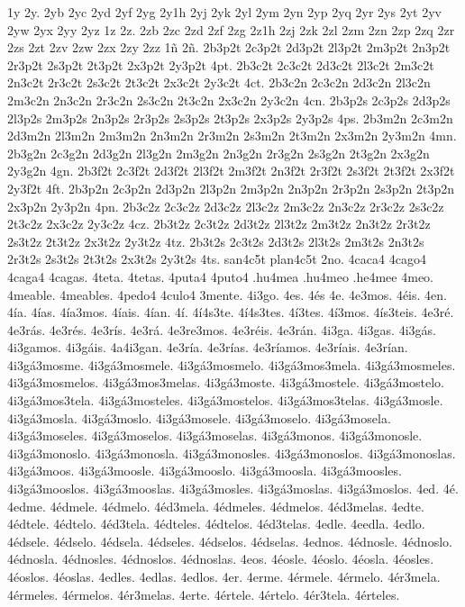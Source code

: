 {1y 2y. 2yb 2yc 2yd 2yf 2yg 2y1h 2yj 2yk 2yl 2ym 2yn 2yp 2yq 2yr 2ys 2yt 2yv 2yw 2yx 2yy 2yz
1z 2z. 2zb 2zc 2zd 2zf 2zg 2z1h 2zj 2zk 2zl 2zm 2zn 2zp 2zq 2zr 2zs 2zt 2zv 2zw 2zx 2zy 2zz
1ñ 2ñ.
2b3p2t 2c3p2t 2d3p2t 2l3p2t 2m3p2t 2n3p2t 2r3p2t 2s3p2t 2t3p2t 2x3p2t 2y3p2t 4pt.
2b3c2t 2c3c2t 2d3c2t 2l3c2t 2m3c2t 2n3c2t 2r3c2t 2s3c2t 2t3c2t 2x3c2t 2y3c2t 4ct.
2b3c2n 2c3c2n 2d3c2n 2l3c2n 2m3c2n 2n3c2n 2r3c2n 2s3c2n 2t3c2n 2x3c2n 2y3c2n 4cn.
2b3p2s 2c3p2s 2d3p2s 2l3p2s 2m3p2s 2n3p2s 2r3p2s 2s3p2s 2t3p2s 2x3p2s 2y3p2s 4ps.
2b3m2n 2c3m2n 2d3m2n 2l3m2n 2m3m2n 2n3m2n 2r3m2n 2s3m2n 2t3m2n 2x3m2n 2y3m2n 4mn.
2b3g2n 2c3g2n 2d3g2n 2l3g2n 2m3g2n 2n3g2n 2r3g2n 2s3g2n 2t3g2n 2x3g2n 2y3g2n 4gn.
2b3f2t 2c3f2t 2d3f2t 2l3f2t 2m3f2t 2n3f2t 2r3f2t 2s3f2t 2t3f2t 2x3f2t 2y3f2t 4ft.
2b3p2n 2c3p2n 2d3p2n 2l3p2n 2m3p2n 2n3p2n 2r3p2n 2s3p2n 2t3p2n 2x3p2n 2y3p2n 4pn.
2b3c2z 2c3c2z 2d3c2z 2l3c2z 2m3c2z 2n3c2z 2r3c2z 2s3c2z 2t3c2z 2x3c2z 2y3c2z 4cz.
2b3t2z 2c3t2z 2d3t2z 2l3t2z 2m3t2z 2n3t2z 2r3t2z 2s3t2z 2t3t2z 2x3t2z 2y3t2z 4tz.
2b3t2s 2c3t2s 2d3t2s 2l3t2s 2m3t2s 2n3t2s 2r3t2s 2s3t2s 2t3t2s 2x3t2s 2y3t2s 4ts.
san4c5t
plan4c5t
2no.
4caca4
4cago4
4caga4
4cagas.
4teta.
4tetas.
4puta4
4puto4
.hu4mea
.hu4meo
.he4mee
4meo.
4meable.
4meables.
4pedo4
4culo4
3mente.
4i3go.
4es.
4és
4e.
4e3mos.
4éis.
4en.
4ía.
4ías.
4ía3mos.
4íais.
4ían.
4í.
4í4s3te.
4í4s3tes.
4í3tes.
4í3mos.
4ís3teis.
4e3ré.
4e3rás.
4e3rés.
4e3rís.
4e3rá.
4e3re3mos.
4e3réis.
4e3rán.
4i3ga.
4i3gas.
4i3gás.
4i3gamos.
4i3gáis.
4a4i3gan.
4e3ría.
4e3rías.
4e3ríamos.
4e3ríais.
4e3rían.
4i3gá3mosme.
4i3gá3mosmele.
4i3gá3mosmelo.
4i3gá3mos3mela.
4i3gá3mosmeles.
4i3gá3mosmelos.
4i3gá3mos3melas.
4i3gá3moste.
4i3gá3mostele.
4i3gá3mostelo.
4i3gá3mos3tela.
4i3gá3mosteles.
4i3gá3mostelos.
4i3gá3mos3telas.
4i3gá3mosle.
4i3gá3mosla.
4i3gá3moslo.
4i3gá3mosele.
4i3gá3moselo.
4i3gá3mosela.
4i3gá3moseles.
4i3gá3moselos.
4i3gá3moselas.
4i3gá3monos.
4i3gá3monosle.
4i3gá3monoslo.
4i3gá3monosla.
4i3gá3monosles.
4i3gá3monoslos.
4i3gá3monoslas.
4i3gá3moos.
4i3gá3moosle.
4i3gá3mooslo.
4i3gá3moosla.
4i3gá3moosles.
4i3gá3mooslos.
4i3gá3mooslas.
4i3gá3mosles.
4i3gá3moslas.
4i3gá3moslos.
4ed.
4é.
4edme.
4édmele.
4édmelo.
4éd3mela.
4édmeles.
4édmelos.
4éd3melas.
4edte.
4édtele.
4édtelo.
4éd3tela.
4édteles.
4édtelos.
4éd3telas.
4edle.
4eedla.
4edlo.
4édsele.
4édselo.
4édsela.
4édseles.
4édselos.
4édselas.
4ednos.
4édnosle.
4édnoslo.
4édnosla.
4édnosles.
4édnoslos.
4édnoslas.
4eos.
4éosle.
4éoslo.
4éosla.
4éosles.
4éoslos.
4éoslas.
4edles.
4edlas.
4edlos.
4er.
4erme.
4érmele.
4érmelo.
4ér3mela.
4érmeles.
4érmelos.
4ér3melas.
4erte.
4értele.
4értelo.
4ér3tela.
4érteles.
}
